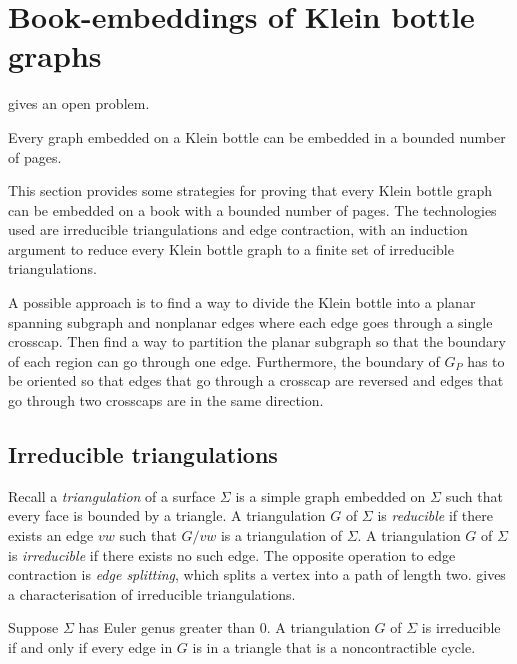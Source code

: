 \section{Book-embeddings of Klein bottle graphs}\label{sec:kleinbottle}
\textcite{ozekiBookEmbeddingGraphs2019} gives an open problem.
\begin{conjecture}\label{conj:klein_bottle}
    Every graph embedded on a Klein bottle can be embedded in a bounded number of pages.
\end{conjecture}

This section provides some strategies for proving that every Klein bottle graph can be embedded on a book with a bounded number of pages. The technologies used are irreducible triangulations and edge contraction, with an induction argument to reduce every Klein bottle graph to a finite set of irreducible triangulations.

A possible approach is to find a way to divide the Klein bottle into a planar spanning subgraph and nonplanar edges where each edge goes through a single crosscap. Then find a way to partition the planar subgraph so that the boundary of each region can go through one edge. Furthermore, the boundary of $G_P$ has to be oriented so that edges that go through a crosscap are reversed and edges that go through two crosscaps are in the same direction. 

\subsection{Irreducible triangulations}
Recall a \textit{triangulation} of a surface $\Sigma$ is a simple graph embedded on $\Sigma$ such that every face is bounded by a triangle. A triangulation $G$ of $\Sigma$ is \textit{reducible} if there exists an edge $vw$ such that $G / vw$ is a triangulation of $\Sigma$. A triangulation $G$ of $\Sigma$ is \textit{irreducible} if there exists no such edge. The opposite operation to edge contraction is \textit{edge splitting}, which splits a vertex into a path of length two. \textcite{barnetteGeneratingTriangulationsProjective1982} gives a characterisation of irreducible triangulations. 

\begin{proposition}
    Suppose $\Sigma$ has Euler genus greater than $0$. A triangulation $G$ of $\Sigma$ is irreducible if and only if every edge in $G$ is in a triangle that is a noncontractible cycle.
\end{proposition}


